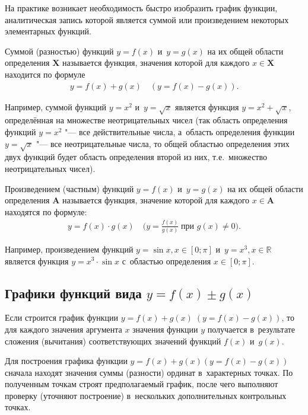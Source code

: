 На практике возникает необходимость быстро изобразить график функции,
аналитическая запись которой является суммой или произведением
некоторых элементарных функций.

\begin{Def}
Суммой (разностью) функций $y = f(x)$ и~$y = g(x)$
на их общей области определения $\mathbf{X}$ называется функция,
значения которой для каждого $x \in \mathbf{X}$ находится по формуле
\begin{gather*}
y = f(x) + g(x) \quad (y = f(x) - g(x)).
\end{gather*}
\end{Def}

Например, суммой функций $y = x^{2}$ и~$y = \sqrt{x}$ является
функция $y = x^{2} + \sqrt{x}$, определённая на множестве
неотрицательных чисел (так область определения функций $y = x^{2}$
"--- все действительные числа, а~область определения функции
$y = \sqrt{x}$ "--- все неотрицательные числа, то общей областью
определения этих двух функций будет область определения второй из них,
т.е.\ множество неотрицательных чисел).

\begin{Def}
Произведением (частным) функций $y = f(x)$ и~$y = g(x)$ на их общей
области определения $\mathbf{A}$ называется функция, значение которой
для каждого $x \in \mathbf{A}$ находятся по формуле:
\begin{gather*}
y = f(x) \cdot g(x) \quad
(\displaystyle y = \frac{f(x)}{g(x)} \;
\text{при $g(x) \ne 0)$}.
\end{gather*}
\end{Def}

Например, произведением функций $y = \sin x, x \in [0; \pi]$
и~$y = x^{3}, x \in \mathbb{R}$ является функция $y = x^{3} \cdot \sin x$
с~областью определения $x \in [0; \pi]$.


\subsection{Графики функций вида $y = f(x) \pm g(x)$}

Если строится график функции $y = f(x) + g(x) \; (y = f(x) - g(x))$,
то для каждого значения аргумента $x$ значения функции $y$ получается
в~результате сложения (вычитания) соответствующих значений функций
$f(x)$ и~$g(x)$.

Для построения графика функции $y = f(x) + g(x) (y = f(x) - g(x))$
сначала находят значения суммы (разности) ординат в~характерных точках.
По полученным точкам строят предполагаемый график, после чего выполняют
проверку (уточняют построение) в~нескольких дополнительных
контрольных точках.

